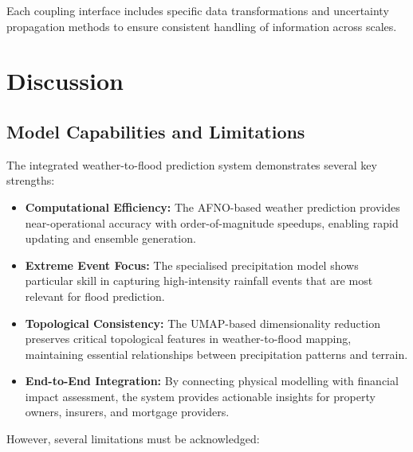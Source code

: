 \documentclass{article}
\begin{document}
Each coupling interface includes specific data transformations and uncertainty propagation methods to ensure consistent handling of information across scales.

\section{Discussion}
\subsection{Model Capabilities and Limitations}

The integrated weather-to-flood prediction system demonstrates several key strengths:

\begin{itemize}
    \item \textbf{Computational Efficiency:} The AFNO-based weather prediction provides near-operational accuracy with order-of-magnitude speedups, enabling rapid updating and ensemble generation.
    
    \item \textbf{Extreme Event Focus:} The specialised precipitation model shows particular skill in capturing high-intensity rainfall events that are most relevant for flood prediction.
    
    \item \textbf{Topological Consistency:} The UMAP-based dimensionality reduction preserves critical topological features in weather-to-flood mapping, maintaining essential relationships between precipitation patterns and terrain.
    
    \item \textbf{End-to-End Integration:} By connecting physical modelling with financial impact assessment, the system provides actionable insights for property owners, insurers, and mortgage providers.
\end{itemize}

However, several limitations must be acknowledged:
\end{document}
